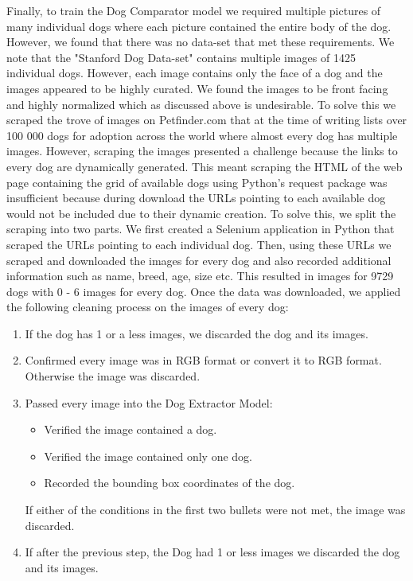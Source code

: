 \documentclass{article}
\begin{document}
Finally, to train the Dog Comparator model we required multiple pictures of many individual dogs where each picture contained the entire body of the dog.  However, we found that there was no data-set that met these requirements.  We note that the "Stanford Dog Data-set" \cite{stanforddogs} contains multiple images of 1425 individual dogs.  However, each image contains only the face of a dog and the images appeared to be highly curated.  We found the images to be front facing and highly normalized which as discussed above is undesirable.  To solve this we scraped the trove of images on Petfinder.com that at the time of writing lists over 100 000 dogs for adoption across the world where almost every dog has multiple images.  However, scraping the images presented a challenge because the links to every dog are dynamically generated.  This meant scraping the HTML of the web page containing the grid of available dogs using Python's request package was insufficient because during download the URLs pointing to each available dog would not be included due to their dynamic creation.  To solve this, we split the scraping into two parts.  We first created a Selenium application in Python that scraped the URLs pointing to each individual dog.  Then, using these URLs we scraped and downloaded the images for every dog and also recorded additional information such as name, breed, age, size etc.  This resulted in images for 9729 dogs with 0 - 6 images for every dog.  Once the data was downloaded, we applied the following cleaning process on the images of every dog:
\begin{enumerate}
  
  \item If the dog has 1 or a less images, we discarded the dog and its images.
  
  \item Confirmed every image was in RGB format or convert it to RGB format.  Otherwise the image was discarded.
  
  \item Passed every image into the Dog Extractor Model:
    \begin{itemize}
      \item Verified the image contained a dog.
      \item Verified the image contained only one dog.
      \item Recorded the bounding box coordinates of the dog.
    \end{itemize}
    If either of the conditions in the first two bullets were not met, the image was discarded.
    
  \item If after the previous step, the Dog had 1 or less images we discarded the dog and its images.
  
\end{enumerate}
\end{document}
